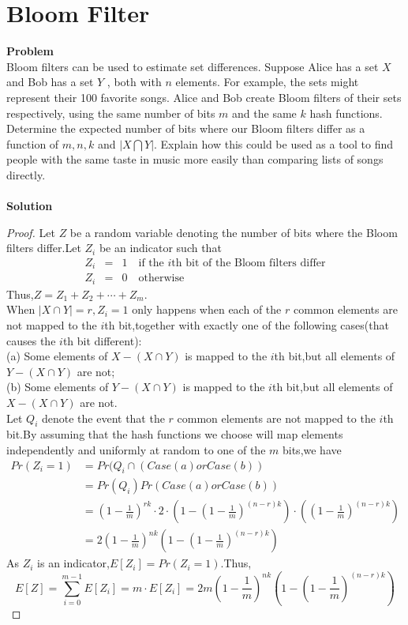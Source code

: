 	\section{Bloom Filter}
	\textbf{Problem}\\
	Bloom filters can be used to estimate set differences. Suppose Alice has a set $X$ and Bob has a set $Y$ , both with $n$ elements. For example, the sets might represent their 100 favorite songs. Alice and Bob create Bloom filters of their sets respectively, using the same number of bits $m$ and the same $k$ hash functions. Determine the expected number of bits where our Bloom filters differ as a function of $m, n, k$ and $|X \bigcap Y|$. Explain how this could be used as a tool to find people with the same taste in music more easily than comparing lists of songs directly.\\\\
	\textbf{Solution}\\
	\begin{proof}
		Let $Z$ be a random variable denoting the number of bits where the Bloom filters differ.Let $Z_i$ be an indicator such that
	\begin{eqnarray*}
		Z_i&=&1  \quad \text{if the $i$th bit of the Bloom filters differ}\\
		Z_i&=&0  \quad \text{otherwise}
	\end{eqnarray*}
	Thus,$Z=Z_1+Z_2+ \cdots + Z_m$.\\
	When $|X\cap Y|=r,Z_i=1$ only happens when each of the $r$ common elements are not mapped to the $i$th bit,together with exactly one of the following cases(that causes the $i$th bit different):\\
	(a) Some elements of $X-(X \cap Y)$ is mapped to the $i$th bit,but all elements of $Y-(X \cap Y)$ are not;\\
	(b) Some elements of $Y-(X \cap Y)$ is mapped to the $i$th bit,but all elements of $X-(X \cap Y)$ are not.\\
	Let $Q_i$ denote the event that the $r$ common elements are not mapped to the $i$th bit.By assuming that the hash functions we choose will map elements independently and uniformly at random to one of the $m$ bits,we have
	\begin{equation*}
		\begin{split}
			Pr(Z_i=1)
			&= Pr(Q_i \cap (Case(a) or Case(b))\\
			&= Pr(Q_i)Pr(Case(a) or Case(b))\\
			&= \left(1-\frac{1}{m}\right)^{rk}\cdot 2 \cdot \left(1-\left(1-\frac{1}{m}\right)^{(n-r)k}\right) \cdot \left(\left(1-\frac{1}{m}\right)^{(n-r)k}\right)\\
			&= 2 \left(1-\frac{1}{m}\right)^{nk} \left(1-\left(1-\frac{1}{m}\right)^{(n-r)k}\right)
		\end{split}
	\end{equation*}
	As $Z_i$ is an indicator,$E[Z_i]=Pr(Z_i=1)$.Thus,
	\[
		E[Z]=\sum_{i=0}^{m-1}E[Z_i]=m \cdot E[Z_i]=2m \left(1-\frac{1}{m}\right)^{nk} \left(1-\left(1-\frac{1}{m}\right)^{(n-r)k}\right)
	\]
	\end{proof}
	
